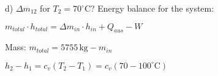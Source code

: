 d) \( \Delta m_{12} \) for \( T_2 = 70^\circ \text{C} \)?  
Energy balance for the system:  

\( m_{total} \cdot h_{total} = \Delta m_{in} \cdot h_{in} + Q_{aus} - W \)  

Mass: \( m_{total} = 5755 \, \text{kg} - m_{in} \)  

\( h_2 - h_1 = c_v (T_2 - T_1) = c_v (70 - 100^\circ \text{C}) \)